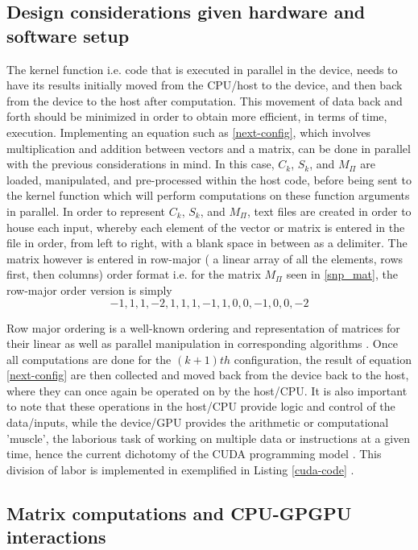 \documentclass{acm_proc_article-sp}
\begin{document}
\subsection{Design considerations given hardware and software
setup}

The kernel function i.e. code that is executed in parallel in
the device, needs to have its results initially moved from the
CPU/host to the device, and then back from the device to the
host after computation. This movement of data back and
forth should be minimized in order to obtain more efficient,
in terms of time, execution.
Implementing an equation such as \ref{next-config}, which involves
multiplication and addition between vectors and a matrix,
can be done in parallel with the previous considerations in
mind. In this case, $C_k$, $S_k$, and $M_{\Pi}$ are loaded, manipulated, and pre-processed within the host code,
before being sent to the kernel function which will perform
computations on these function arguments in parallel.
In order to represent $C_k$, $S_k$, and $M_{\Pi}$, text files are created in
order to house each input, whereby each element of the
vector or matrix is entered in the file in order, from left to right, with a blank space in between as a delimiter. The
matrix however is entered in row-major ( a linear array of all
the elements, rows first, then columns) order format i.e. for
the matrix $M_{\Pi}$ seen in \ref{snp_mat}, the row-major order version is simply
\begin{equation}\label{row-maj}
-1, 1, 1, -2, 1, 1, 1, -1, 1, 0, 0, -1, 0, 0, -2
\end{equation}

Row major ordering is a well-known ordering and
representation of matrices for their linear as well as parallel
manipulation in corresponding algorithms \cite{cudabook}. Once all
computations are done for the $(k+1)th$ configuration, the result of
equation \ref{next-config} are then collected and moved back from the
device back to the host, where they can once again be
operated on by the host/CPU. It is also important to note
that these operations in the host/CPU provide logic and
control of the data/inputs, while the device/GPU provides
the arithmetic or computational 'muscle', the laborious task
of working on multiple data or instructions at a given time,
hence the current dichotomy of the CUDA programming model \cite{sat}.
This division of labor is implemented in exemplified in Listing \ref{cuda-code} .

\subsection{Matrix
computations
and
CPU-GPGPU
interactions
}
\end{document}
